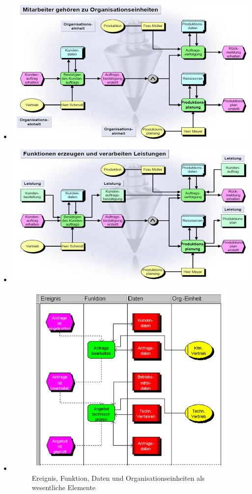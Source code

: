 \documentclass[11pt,a4paper]{article}
\begin{document}
\begin{itemize}
\begin{itemize}
		\item[] \includegraphics[width=15cm]{Bilder/eepk4}
		\item[] \includegraphics[width=15cm]{Bilder/eepk5}
		
		\item[] 
			\begin{figure}[H]
			\centering
			\includegraphics[width=15cm]{Bilder/eepk6}
			\caption{Ereignis, Funktion, Daten und Organisationseinheiten als wesentliche Elemente}
			\end{figure}
		\end{itemize}
	

\end{itemize}
\end{document}
